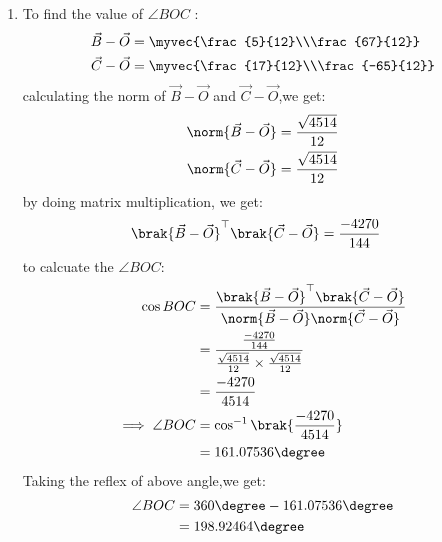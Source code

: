 \documentclass[journal,12pt,twocolumn]{IEEEtran}
\theoremstyle{remark}
\begin{document}
\begin{enumerate}
\item To find  the value of $\angle{BOC}$ :
\begin{align}
\vec{B}-\vec{O}
          &=\myvec{\frac{5}{12}\\\frac{67}{12}}\\
\vec{C}-\vec{O}
          &=\myvec{\frac{17}{12}\\\frac{-65}{12}}
\end{align}
calculating the norm of $\vec{B}-\vec{O}$ and $\vec{C}-\vec{O}$,we get:
\begin{align}
	\norm{\vec{B}-\vec{O}}&= \frac{\sqrt{4514}}{12}\\
	\norm{\vec{C}-\vec{O}}&= \frac{\sqrt{4514}}{12}
\end{align}
by doing matrix multiplication, we get:
\begin{align}
\brak{\vec{B}-\vec{O}}^{\top}\brak{\vec{C}-\vec{O}}&=\frac{-4270}{144}
\end{align}
to calcuate the $\angle{BOC}$:
\begin{align}
\cos{BOC}&=\frac{\brak{\vec{B}-\vec{O}}^{\top}\brak{\vec{C}-\vec{O}}}{\norm{\vec{B}-\vec{O}}\norm{\vec{C}-\vec{O}}}\\
&=\frac{\frac{-4270}{144}}{\frac{\sqrt{4514}}{12}\times\frac{\sqrt{4514}}{12}}\\
&=\frac{-4270}{4514}\\
\implies\angle{BOC}&=\cos^{-1}\brak{\frac{-4270}{4514}}\\
&=161.07536\degree
\end{align}
Taking the reflex of above angle,we get:
\begin{align}
\angle{BOC}&=360\degree-161.07536\degree\\&=198.92464\degree\label{eq:1}
\end{align}







\end{enumerate}
\end{document}
